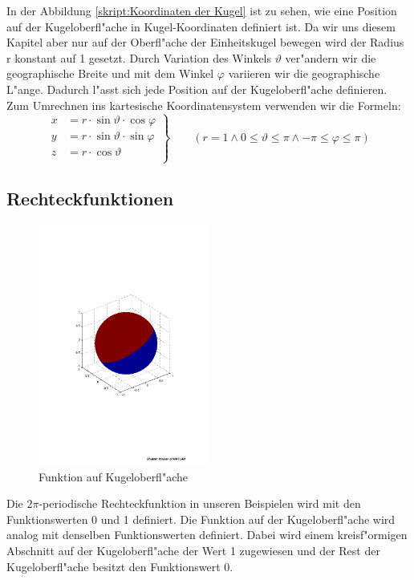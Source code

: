 \begin{refsection}
In der Abbildung \ref{skript:Koordinaten der Kugel} 
ist zu sehen, wie eine Position auf der Kugeloberfl"ache in
Kugel-Koordinaten definiert ist. 
Da wir uns diesem Kapitel  aber nur auf der Oberfl"ache der 
Einheitskugel bewegen wird der Radius r konstant auf 1 gesetzt. 
Durch Variation des Winkels $\vartheta$ ver"andern wir die geographische
Breite und mit dem Winkel $\varphi$ variieren wir die geographische 
L"ange. 
Dadurch l"asst sich jede Position auf der Kugeloberfl"ache definieren. 
Zum Umrechnen ins kartesische Koordinatensystem verwenden wir die 
Formeln:
\[
\left.\begin{aligned}
x& = r \cdot \sin\vartheta \cdot \cos\varphi\\
y& = r \cdot \sin\vartheta \cdot \sin\varphi\\
z& = r \cdot \cos\vartheta\\      
\end{aligned}
\right\}
\qquad (r = 1 \wedge 0 \leq \vartheta \leq \pi \wedge {-\pi} \leq \varphi \leq \pi)
\]

\subsection{Rechteckfunktionen}
\begin{figure}%
\centering
\includegraphics[width=0.5\textwidth]{kugel/Funktion.pdf}
\caption{Funktion auf Kugeloberfl"ache
\label{skript:Funktion auf Kugeloberfl"ache}}
\end{figure}
Die $2\pi$-periodische Rechteckfunktion in unseren Beispielen wird 
mit den Funktionswerten 0 und 1 definiert. 
Die Funktion auf der Kugeloberfl"ache wird analog 
mit denselben Funktionswerten definiert. 
Dabei wird einem kreisf"ormigen Abschnitt auf der Kugeloberfl"ache 
der Wert 1 zugewiesen und der Rest der Kugeloberfl"ache besitzt den 
Funktionswert 0. 


\end{refsection}

